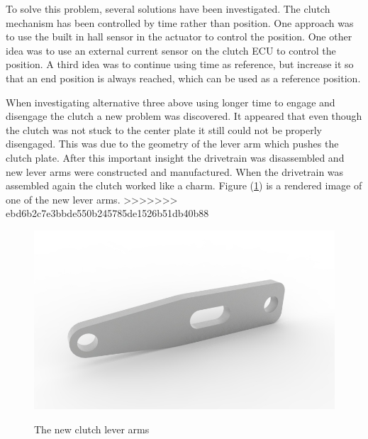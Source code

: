 To solve this problem, several solutions have been investigated. The clutch mechanism has been controlled by time rather than position. One approach was to use the built in hall sensor in the actuator to control the position. One other idea was to use an external current sensor on the clutch ECU to control the position. A third idea was to continue using time as reference, but increase it so that an end position is always reached, which can be used as a reference position.

When investigating alternative three above using longer time to engage and disengage the clutch a new problem was discovered. It appeared that even though the clutch was not stuck to the center plate it still could not be properly disengaged. This was due to the geometry of the lever arm which pushes the clutch plate.  After this important insight the drivetrain was disassembled and new lever arms were constructed and manufactured. When the drivetrain was assembled again the clutch worked like a charm. Figure (\ref{fig:clutch}) is a rendered image of one of the new lever arms.
>>>>>>> ebd6b2c7e3bbde550b245785de1526b51db40b88

\begin{figure}[H]
    \centering\label{fig:clutch}
    \includegraphics[width=1\textwidth]{./img/clutch}
    \caption{The new clutch lever arms}
\end{figure}

